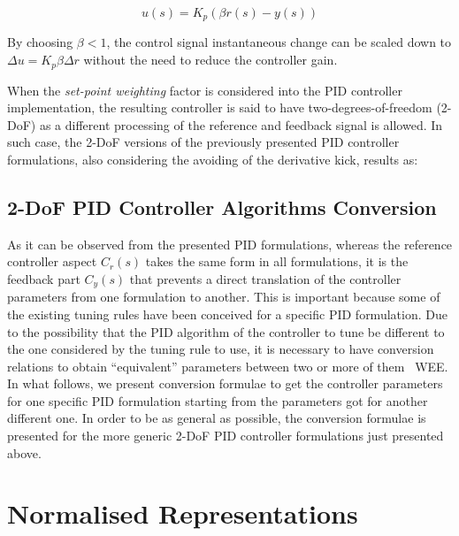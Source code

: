 \begin{equation}
u(s)=K_p(\beta r(s) - y(s))
\end{equation}

By choosing $\beta < 1$, the control signal instantaneous change can be scaled down to $\Delta u = K_p \beta \Delta r$  without the need to reduce the controller gain. 

When the \emph{set-point weighting} factor is considered into the PID controller implementation, the resulting controller is said to have two-degrees-of-freedom (2-DoF) as a different processing of the reference and feedback signal is allowed. In such case, the 2-DoF versions of the previously presented PID controller formulations, also considering the avoiding of the derivative kick, results as:

\subsection{2-DoF PID Controller Algorithms Conversion}
As it can be observed from the presented PID formulations, whereas the reference controller aspect $C_r(s)$ takes the same form in all formulations, it is the feedback part $C_y(s)$  that prevents a direct translation of the controller parameters from one formulation to another. This is important because some of the existing tuning rules have been conceived for a specific PID formulation. Due to the possibility that the PID algorithm of the controller to tune be different to the one considered by the tuning rule to use, it is necessary to have conversion relations to obtain ``equivalent'' parameters between two or more of them~\cite{alfaroetfa2012-2} WEE. In what follows, we present conversion formulae to get the controller parameters for one specific PID formulation starting from the parameters got for another different one. In order to be as general as possible, the conversion formulae is presented for the more generic 2-DoF PID controller formulations just presented above.


\section{Normalised Representations}
\label{sec:3}

